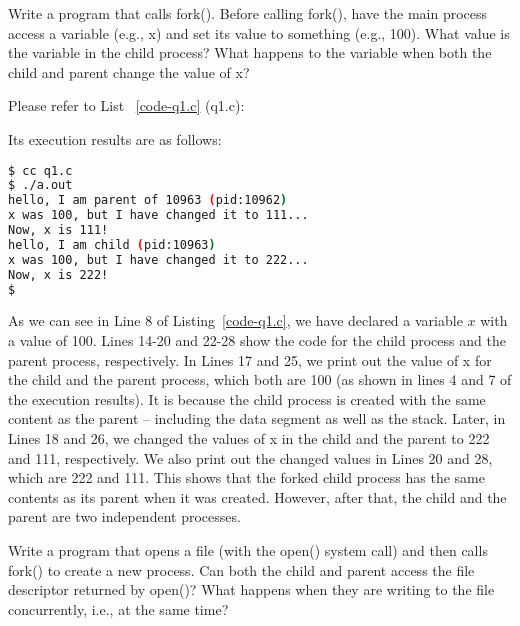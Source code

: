 \documentclass[10pt, answers]{exam}
\begin{document}

\begin{questions} 
\setcounter{question}{0} 

\question 
Write a program that calls fork(). Before calling fork(), have the main process access a variable (e.g., x) and set its value to something (e.g., 100). What value is the variable in the child process? What happens to the variable when both the child and parent change the value of x?

\begin{solution}
Please refer to List ~\ref{code-q1.c} (q1.c):



Its execution results are as follows:

\begin{lstlisting}[language=bash]
$ cc q1.c
$ ./a.out 
hello, I am parent of 10963 (pid:10962)
x was 100, but I have changed it to 111...
Now, x is 111!
hello, I am child (pid:10963)
x was 100, but I have changed it to 222...
Now, x is 222!
$
\end{lstlisting}

As we can see in Line 8 of Listing~\ref{code-q1.c}, we have declared a variable $x$ with a value of 100. Lines 14-20 and 22-28 show the code for the child process and the parent process, respectively. In Lines 17 and 25, we print out the value of x for the child and the parent process, which both are 100 (as shown in lines 4 and 7 of the execution results). It is because the child process is created with the same content as the parent -- including the data segment as well as the stack. Later, in Lines 18 and 26, we changed the values of x in the child and the parent to 222 and 111, respectively. We also print out the changed values in Lines 20 and 28, which are 222 and 111. This shows that the forked child process has the same contents as its parent when it was created. However, after that, the child and the parent are two independent processes.



\end{solution}

\question
Write a program that opens a file (with the open() system call) and then calls fork() to create a new process. Can both the child and parent access the file descriptor returned by open()? What happens when they are writing to the file concurrently, i.e., at the same time?


\end{questions}
\end{document}
